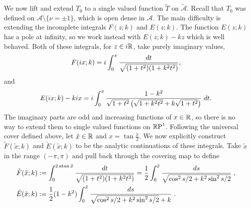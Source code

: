 \documentclass{article}
\begin{document}
We now lift and extend $T_0$ to a single valued function $\tilde{T}$ on $\mathcal{\tilde{A}}$. Recall that $T_0$ was defined on $\mathcal{A}\setminus\{\nu = \pm 1\}$, which is open dense in $\mathcal{A}$. The main difficulty is extending the incomplete integrals $F(z;k)$ and $E(z;k)$. The function $E(z;k)$ has a pole at infinity, so we work instead with $E(z;k) - kz$ which is well behaved. Both of these integrals, for $z\in i\mathbb{R}$, take purely imaginary values,
\[
F(i x; k)
= i \int_0^x \frac{dt}{\sqrt{(1+t^2)(1+k^2 t^2)}},
\]
and
\[
E(i x; k) - ki x
= i \int_0^x \frac{1-k^2}{\sqrt{1+t^2}\left( \sqrt{1+k^2t^2} + k\sqrt{1+t^2} \right)} \;dt.
\]
The imaginary parts are odd and increasing functions of $x\in\mathbb{R}$, so there is no way to extend them to single valued functions on $\mathbb{R}\text{P}^1$. Following the universal cover defined above, let $\tilde{x}\in\mathbb{R}$ and $x = \tan\frac{\tilde{x}}{2}$. We now explicitly construct $\tilde{F}(\tilde{x};k)$ and $\tilde{E}(\tilde{x};k)$ to be the analytic continuations of these integrals. Take $\tilde{x}$ in the range $(-\pi,\pi)$ and pull back through the covering map to define
\begin{align*}
\tilde{F}(\tilde{x};k)
&:= \int_0^{2 \operatorname{atan} \tilde{x}} \frac{dt}{\sqrt{(1+t^2)(1+k^2t^2)}}
= \frac{1}{2} \int_0^{\tilde{x}} \frac{ds}{\sqrt{\cos^2 s/2 + k^2 \sin^2 s/2}} \;, \\
\tilde{E}(\tilde{x}; k)
&:= \frac{1}{2} (1-k^2) \int_0^{\tilde{x}} \frac{ds}{\sqrt{\cos^2 s/2 + k^2\sin^2 s/2} + k}\;.
\end{align*}
\end{document}
